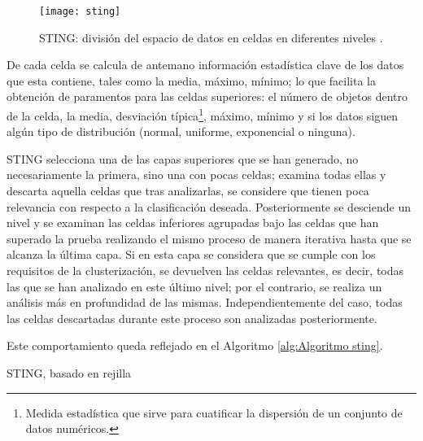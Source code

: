 \documentclass[10pt, a4paper]{article}
\begin{document}
\begin{figure}[ht]
\centering
\texttt{[image: sting]}
\caption{STING: división del espacio de datos en celdas en diferentes niveles \cite{sting 2}.}
\label{fig:sting}
\end{figure}

De cada celda se calcula de antemano información estadística clave de los datos que esta contiene, tales como la media, máximo, mínimo; lo que facilita la obtención de paramentos para las celdas superiores: el número de objetos dentro de la celda, la media, desviación típica\footnote{Medida estadística que sirve para cuatificar la dispersión de un conjunto de datos numéricos.}, máximo, mínimo y si los datos siguen algún tipo de distribución (normal, uniforme, exponencial o ninguna). 

STING selecciona una de las capas superiores que se han generado, no necesariamente la primera, sino una con pocas celdas; examina todas ellas y descarta aquella celdas que tras analizarlas, se considere que tienen poca relevancia con respecto a la clasificación deseada. Posteriormente se desciende un nivel y se examinan las celdas inferiores agrupadas bajo las celdas que han superado la prueba realizando el mismo proceso de manera iterativa hasta que se alcanza la última capa. Si en esta capa se considera que se cumple con los requisitos de la clusterización, se devuelven las celdas relevantes, es decir, todas las que se han analizado en este último nivel; por el contrario, se realiza un análisis más en profundidad de las mismas. Independientemente del caso, todas las celdas descartadas durante este proceso son analizadas posteriormente. 

Este comportamiento queda reflejado en el Algoritmo \ref{alg:Algoritmo sting}.

\begin{algorithm}[ht]
\SetAlgoLined
  \LinesNumbered
  \DontPrintSemicolon
  \caption{STING, basado en rejilla}
  \label{alg:Algoritmo sting}
\end{algorithm}
\end{document}
